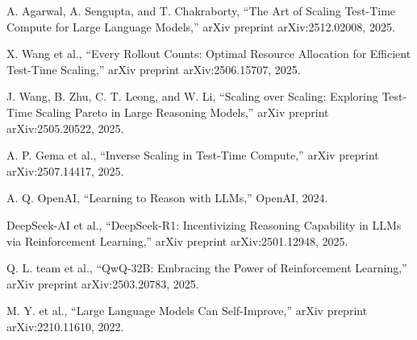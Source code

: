 \documentclass[12pt,a4paper,titlepage]{report}
\begin{document}
\begin{enumerate}[label={[\arabic*]}, leftmargin=*, itemsep=0.45em, align=left]
\item A. Agarwal, A. Sengupta, and T. Chakraborty, ``The Art of Scaling Test-Time Compute for Large Language Models,'' arXiv preprint arXiv:2512.02008, 2025.

\item X. Wang et al., ``Every Rollout Counts: Optimal Resource Allocation for Efficient Test-Time Scaling,'' arXiv preprint arXiv:2506.15707, 2025.

\item J. Wang, B. Zhu, C. T. Leong, and W. Li, ``Scaling over Scaling: Exploring Test-Time Scaling Pareto in Large Reasoning Models,'' arXiv preprint arXiv:2505.20522, 2025. 

\item A. P. Gema et al., ``Inverse Scaling in Test-Time Compute,'' arXiv preprint arXiv:2507.14417, 2025. 

\item A. Q. OpenAI, ``Learning to Reason with LLMs,'' OpenAI, 2024. 

\item DeepSeek-AI et al., ``DeepSeek-R1: Incentivizing Reasoning Capability in LLMs via Reinforcement Learning,'' arXiv preprint arXiv:2501.12948, 2025. 

\item Q. L. team et al., ``QwQ-32B: Embracing the Power of Reinforcement Learning,'' arXiv preprint arXiv:2503.20783, 2025. 

\item M. Y. et al., ``Large Language Models Can Self-Improve,'' arXiv preprint arXiv:2210.11610, 2022. 

\end{enumerate}
\end{document}

